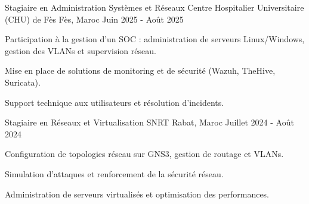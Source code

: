 
\begin{cventries}
    \cventry
    {Stagiaire en Administration Systèmes et Réseaux}
    {Centre Hospitalier Universitaire (CHU) de Fès}
    {Fès, Maroc}
    {Juin 2025 - Août 2025}
    {
        \begin{cvitems}
            \item {Participation à la gestion d'un SOC : administration de serveurs Linux/Windows, gestion des VLANs et supervision réseau.}
            \item {Mise en place de solutions de monitoring et de sécurité (Wazuh, TheHive, Suricata).}
            \item {Support technique aux utilisateurs et résolution d'incidents.}
        \end{cvitems}
    }
    \cventry
    {Stagiaire en Réseaux et Virtualisation}
    {SNRT}
    {Rabat, Maroc}
    {Juillet 2024 - Août 2024}
    {
        \begin{cvitems}
            \item {Configuration de topologies réseau sur GNS3, gestion de routage et VLANs.}
            \item {Simulation d'attaques et renforcement de la sécurité réseau.}
            \item {Administration de serveurs virtualisés et optimisation des performances.}
        \end{cvitems}
    }
\end{cventries}